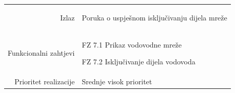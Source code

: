 \documentclass[]{report}
\begin{document}
\begin{tabular}{rp{}}
\\
Izlaz &

\begin{compactitem} 
    \item Poruka o uspješnom isključivanju dijela mreže
\end{compactitem}

\\
Funkcionalni zahtjevi &

\begin{compactitem} 
    \item FZ 7.1 Prikaz vodovodne mreže
    \item FZ 7.2 Isključivanje dijela vodovoda
\end{compactitem}

\\
Prioritet realizacije &
\hspace{12pt} Srednje visok prioritet
\\
\end{tabular}

\newpage 
\end{document}
